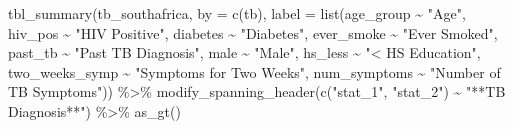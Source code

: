 \documentclass[
  letterpaper,
]{latex/krantz}
\makeatletter
\newenvironment{Shaded}{\begin{snugshade}}{\end{snugshade}}
\newcommand{\AttributeTok}[1]{\textcolor[rgb]{0.40,0.45,0.13}{#1}}
\newcommand{\FunctionTok}[1]{\textcolor[rgb]{0.28,0.35,0.67}{#1}}
\newcommand{\NormalTok}[1]{\textcolor[rgb]{0.00,0.23,0.31}{#1}}
\newcommand{\SpecialCharTok}[1]{\textcolor[rgb]{0.37,0.37,0.37}{#1}}
\newcommand{\StringTok}[1]{\textcolor[rgb]{0.13,0.47,0.30}{#1}}
\newenvironment{kframe}{%
\medskip{}
\setlength{\fboxsep}{.8em}
 \def\at@end@of@kframe{}%
 \ifinner\ifhmode%
  \def\at@end@of@kframe{\end{minipage}}%
  \begin{minipage}{\columnwidth}%
 \fi\fi%
 \def\FrameCommand##1{\hskip\@totalleftmargin \hskip-\fboxsep
 \colorbox{shadecolor}{##1}\hskip-\fboxsep
     \hskip-\linewidth \hskip-\@totalleftmargin \hskip\columnwidth}%
 \MakeFramed {\advance\hsize-\width
   \@totalleftmargin\z@ \linewidth\hsize
   \@setminipage}}%
 {\par\unskip\endMakeFramed%
 \at@end@of@kframe}
\renewenvironment{Shaded}{\begin{kframe}}{\end{kframe}}
\makeatother
\begin{document}
\begin{Shaded}
\begin{Highlighting}[]
\FunctionTok{tbl\_summary}\NormalTok{(tb\_southafrica, }\AttributeTok{by =} \FunctionTok{c}\NormalTok{(tb),}
            \AttributeTok{label =} \FunctionTok{list}\NormalTok{(age\_group }\SpecialCharTok{\textasciitilde{}} \StringTok{"Age"}\NormalTok{,}
\NormalTok{                          hiv\_pos }\SpecialCharTok{\textasciitilde{}} \StringTok{"HIV Positive"}\NormalTok{,}
\NormalTok{                          diabetes }\SpecialCharTok{\textasciitilde{}} \StringTok{"Diabetes"}\NormalTok{,}
\NormalTok{                          ever\_smoke }\SpecialCharTok{\textasciitilde{}} \StringTok{"Ever Smoked"}\NormalTok{,}
\NormalTok{                          past\_tb }\SpecialCharTok{\textasciitilde{}} \StringTok{"Past TB Diagnosis"}\NormalTok{,}
\NormalTok{                          male }\SpecialCharTok{\textasciitilde{}} \StringTok{"Male"}\NormalTok{,}
\NormalTok{                          hs\_less }\SpecialCharTok{\textasciitilde{}} \StringTok{"\textless{} HS Education"}\NormalTok{,}
\NormalTok{                          two\_weeks\_symp }\SpecialCharTok{\textasciitilde{}} \StringTok{"Symptoms for Two Weeks"}\NormalTok{,}
\NormalTok{                          num\_symptoms }\SpecialCharTok{\textasciitilde{}} \StringTok{"Number of TB Symptoms"}\NormalTok{)) }\SpecialCharTok{\%\textgreater{}\%}
  \FunctionTok{modify\_spanning\_header}\NormalTok{(}\FunctionTok{c}\NormalTok{(}\StringTok{"stat\_1"}\NormalTok{, }\StringTok{"stat\_2"}\NormalTok{) }\SpecialCharTok{\textasciitilde{}} 
                           \StringTok{"**TB Diagnosis**"}\NormalTok{) }\SpecialCharTok{\%\textgreater{}\%}
  \FunctionTok{as\_gt}\NormalTok{()}
\end{Highlighting}
\end{Shaded}
\end{document}
